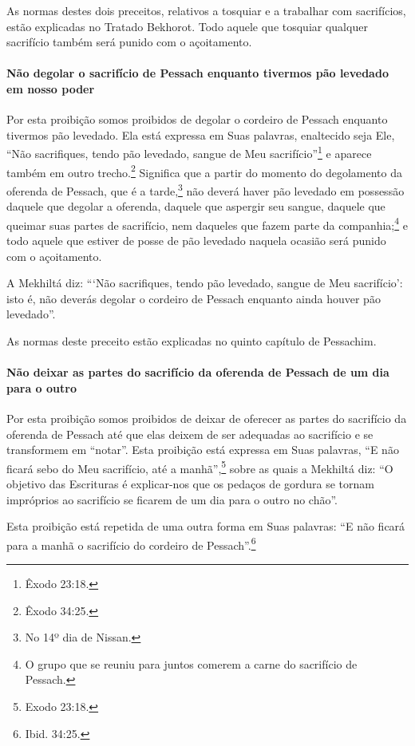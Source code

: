 As normas destes dois preceitos, relativos a tosquiar e a trabalhar com
sacrifícios, estão explicadas no Tratado Bekhorot. Todo aquele que
tosquiar qualquer sacrifício também será punido com o açoitamento.

\paragraph{Não degolar o sacrifício de Pessach enquanto tivermos pão
levedado em nosso poder}

Por esta proibição somos proibidos de degolar o cordeiro de Pessach
enquanto tivermos pão levedado. Ela está expressa em Suas palavras,
enaltecido seja Ele, ``Não sacrifiques, tendo pão levedado, sangue de
Meu sacrifício''\footnote{Êxodo 23:18.} e aparece também em outro
trecho.\footnote{Êxodo 34:25.} Significa que a partir do momento do
degolamento da oferenda de Pessach, que é a
tarde,\footnote{No 14º dia de Nissan.} não deverá haver pão levedado em possessão
daquele que degolar a oferenda, daquele que aspergir seu sangue, daquele
que queimar suas partes de sacrifício, nem daqueles que fazem parte da
companhia;\footnote{O grupo que se reuniu para juntos comerem a carne do sacrifício de
  Pessach.} e todo aquele que estiver de posse de
pão levedado naquela ocasião será punido com o açoitamento.

A Mekhiltá diz: ```Não sacrifiques, tendo pão levedado, sangue de Meu
sacrifício': isto é, não deverás degolar o cordeiro de Pessach
enquanto ainda houver pão levedado''.

As normas deste preceito estão explicadas no quinto capítulo de
Pessachim.

\paragraph{Não deixar as partes do sacrifício da oferenda de Pessach de um dia
para o outro}

Por esta proibição somos proibidos de deixar de oferecer as partes do
sacrifício da oferenda de Pessach até que elas deixem de ser
adequadas ao sacrifício e se transformem em ``notar''. Esta proibição
está expressa em Suas palavras, ``E não ficará sebo do Meu sacrifício,
até a manhã'',\footnote{Exodo 23:18.} sobre as quais a Mekhiltá diz: ``O objetivo
das Escrituras é explicar-nos que os pedaços de gordura se tornam
impróprios ao sacrifício se ficarem de um dia para o outro no chão''.

Esta proibição está repetida de uma outra forma em Suas palavras: ``E
não ficará para a manhã o sacrifício do cordeiro de Pessach''.\footnote{Ibid.
34:25.}

